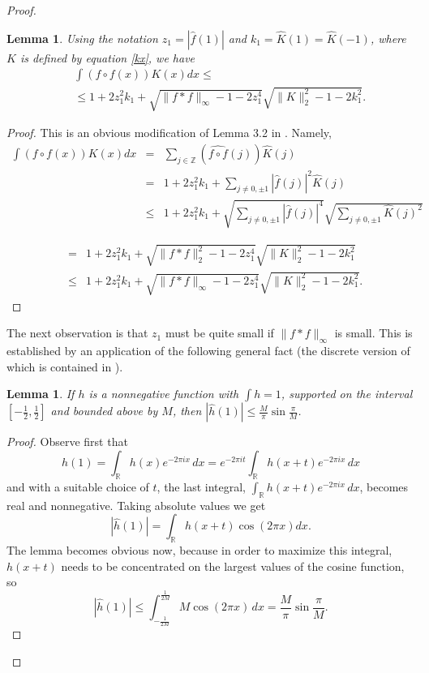 \documentclass[12pt]{amsart}
\newtheorem{lemma}[theorem]{Lemma}
\theoremstyle{definition}
\newcommand{\Z}{\ensuremath{\mathbb{Z}}}
\newcommand{\R}{\ensuremath{\mathbb{R}}}
\begin{document}
\begin{proof}
\small
\begin{lemma}\label{lemma2b}
Using the notation $z_1=|\hat f(1)|$ and $k_1=\hat K(1)=\hat
K(-1)$, where $K$ is defined by equation \eqref{kx}, we have
\begin{eqnarray}&&\label{eq2b}\int (f\circ f (x)) K(x) dx \le \\
&&\le 1+2z_1^2k_1 +\sqrt{\|f\ast f\|_\infty-1-2z_1^4}\sqrt{\|K\|_2^2-1-2k_1^2}. \nonumber
\end{eqnarray}
\end{lemma}
\begin{proof}
This is an obvious modification of Lemma 3.2 in \cite{martin}.
Namely,
\begin{eqnarray*}
\int (f\circ f (x)) K(x) dx & = & \sum_{j\in\Z} (\widehat{f\circ
f}(j))\hat K(j) \\
& = & 1 + 2z_1^2k_1 + \sum_{j\ne 0,\pm 1} |\hat f(j)|^2\hat
K(j) \\
&\le&  1+2z_1^2k_1+ \sqrt{\sum_{j\ne 0,\pm 1} |\hat f(j)|^4}\sqrt{\sum_{j\ne
0,\pm 1} \hat K(j)^2}
\end{eqnarray*}

\begin{eqnarray*}
&=&1+2z_1^2k_1+\sqrt{\|f \ast f\|_2^2-1-2z_1^4}\sqrt{\|K\|_2^2-1-2k_1^2}\\
&\le& 1+2z_1^2k_1+\sqrt{\|f\ast f\|_\infty-1-2z_1^4}\sqrt{\|K\|_2^2-1-2k_1^2}.
\end{eqnarray*}
\end{proof}

The next observation is that $z_1$ must be quite small if $\|f\ast
f\|_\infty$ is small. This is established by an application of the
following general fact (the discrete version of which is contained
in \cite{green}).

\begin{lemma}\label{lemmah}
If $h$ is a nonnegative function with $\int h=1$, supported on the
interval $[-\frac{1}{2},\frac{1}{2}]$ and bounded above by $M$, then $|\hat h(1)|\le \frac{M}{\pi} \sin \frac{\pi}{M}$.
\end{lemma}
\begin{proof}
Observe first that
$$\hat h (1) = \int_{\R} h(x) e^{-2 \pi i x} \, dx = e^{-2 \pi i t} \int_{\R} h(x + t) e^{-2 \pi i x} \, dx$$
and with a suitable choice of $t$, the last integral, $\int_{\R}
h(x + t) e^{-2 \pi i x} \, dx$, becomes real and nonnegative.
Taking absolute values we get
$$|\hat h(1)| = \int_{\R} h(x + t)\cos (2 \pi x) dx.$$
The lemma becomes obvious now, because in order to maximize this integral, $h(x+t)$ needs to be concentrated on the largest values of the cosine function, so
$$|\hat h(1)| \le \int_{-\frac{1}{2M}}^{\frac{1}{2M}} M \cos (2 \pi x) \, dx = \frac{M}{\pi} \sin \frac{\pi}{M}.$$
\end{proof}


\end{proof}
\end{document}

